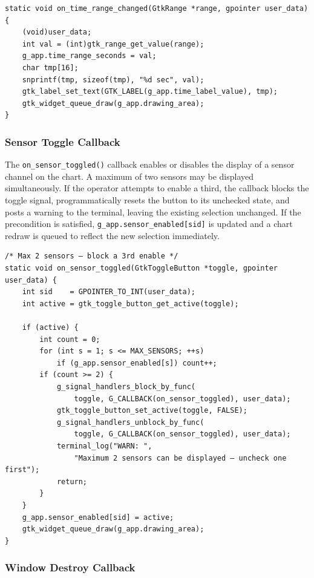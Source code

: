 \begin{verbatim}
static void on_time_range_changed(GtkRange *range, gpointer user_data) {
    (void)user_data;
    int val = (int)gtk_range_get_value(range);
    g_app.time_range_seconds = val;
    char tmp[16];
    snprintf(tmp, sizeof(tmp), "%d sec", val);
    gtk_label_set_text(GTK_LABEL(g_app.time_label_value), tmp);
    gtk_widget_queue_draw(g_app.drawing_area);
}
\end{verbatim}

\subsubsection{Sensor Toggle Callback}

The \texttt{on\_sensor\_toggled()} callback enables or disables the
display of a sensor channel on the chart. A maximum of two sensors may
be displayed simultaneously. If the operator attempts to enable a third,
the callback blocks the toggle signal, programmatically resets the
button to its unchecked state, and posts a warning to the terminal,
leaving the existing selection unchanged. If the precondition is
satisfied, \texttt{g\_app.sensor\_enabled[sid]} is updated and a chart
redraw is queued to reflect the new selection immediately.
\begin{verbatim}
/* Max 2 sensors — block a 3rd enable */
static void on_sensor_toggled(GtkToggleButton *toggle, gpointer user_data) {
    int sid    = GPOINTER_TO_INT(user_data);
    int active = gtk_toggle_button_get_active(toggle);

    if (active) {
        int count = 0;
        for (int s = 1; s <= MAX_SENSORS; ++s)
            if (g_app.sensor_enabled[s]) count++;
        if (count >= 2) {
            g_signal_handlers_block_by_func(
                toggle, G_CALLBACK(on_sensor_toggled), user_data);
            gtk_toggle_button_set_active(toggle, FALSE);
            g_signal_handlers_unblock_by_func(
                toggle, G_CALLBACK(on_sensor_toggled), user_data);
            terminal_log("WARN: ",
                "Maximum 2 sensors can be displayed — uncheck one first");
            return;
        }
    }
    g_app.sensor_enabled[sid] = active;
    gtk_widget_queue_draw(g_app.drawing_area);
}
\end{verbatim}

\subsubsection{Window Destroy Callback}

